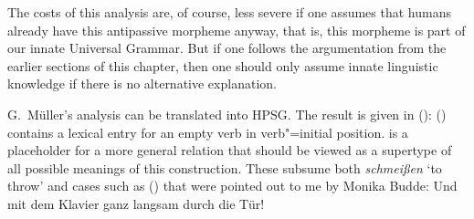 \begin{exe}
\begin{xlist}[iv.]
\begin{exe}
\begin{xlist}[iv.]
The costs of this analysis are, of course, less severe if one assumes that humans already have this antipassive morpheme anyway, that is, this morpheme
is part of our innate Universal Grammar\indexug. But if one follows the argumentation from the earlier sections of this chapter, then one should only assume
innate linguistic knowledge if there is no alternative explanation.

G.\ Müller's analysis can be translated into HPSG. The result is given in ():
\ea
{}
\z
() contains a lexical entry for an empty verb in verb"=initial position. 
is a placeholder for a more general relation that should be viewed as a supertype of all possible meanings of this
construction. These subsume both \emph{schmeißen} `to throw' and cases such as () that were pointed out to me by Monika Budde:
\ea
\label{Klavier-durch-die-Tuer}
\gll Und mit dem Klavier ganz langsam durch die Tür!\\

\end{xlist}
\end{exe}
\end{xlist}
\end{exe}
